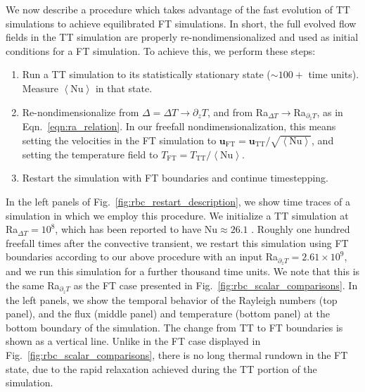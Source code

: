\documentclass[aps, pre, onecolumn, nofootinbib, notitlepage, groupedaddress, amsfonts, amssymb, amsmath, longbibliography, superscriptaddress]{revtex4-1}
\newcommand{\angles}[1]{\ensuremath{\left\langle #1 \right\rangle}}
\begin{document}
We now describe a procedure which takes advantage of the fast evolution of TT simulations to achieve equilibrated FT simulations.
In short, the full evolved flow fields in the TT simulation are properly re-nondimensionalized and used as initial conditions for a FT simulation.
To achieve this, we perform these steps:
\begin{enumerate}
\item Run a TT simulation to its statistically stationary state ($\sim100+$ time units). 
Measure $\angles{\text{Nu}}$ in that state.
\item Re-nondimensionalize from $\Delta = \Delta T \rightarrow \partial_z T$, and from Ra$_{\Delta T}\rightarrow$Ra$_{\partial_z T}$, as in Eqn.~\ref{eqn:ra_relation}.
In our freefall nondimensionalization, this means setting the velocities in the FT simulation to $\bm{u}_{\text{FT}} = \bm{u}_{\text{TT}} / \sqrt{\angles{\text{Nu}}}$, and setting the temperature field to $T_{\text{FT}} = T_{\text{TT}} / \angles{\text{Nu}}$.
\item Restart the simulation with FT boundaries and continue timestepping.
\end{enumerate}
In the left panels of Fig.~\ref{fig:rbc_restart_description}, we show time traces of a simulation in which we employ this procedure.
We initialize a TT simulation at Ra$_{\Delta T} = 10^8$, which has been reported to have $\text{Nu} \approx 26.1$ \cite{zhu&all2018}.
Roughly one hundred freefall times after the convective transient, we restart this simulation using FT boundaries according to our above procedure with an input Ra$_{\partial_z T} = 2.61 \times 10^9$, and we run this simulation for a further thousand time units.
We note that this is the same Ra$_{\partial_z T}$ as the FT case presented in Fig.~\ref{fig:rbc_scalar_comparisons}.
In the left panels, we show the temporal behavior of the Rayleigh numbers (top panel), and the flux (middle panel) and temperature (bottom panel) at the bottom boundary of the simulation.
The change from TT to FT boundaries is shown as a vertical line.
Unlike in the FT case displayed in Fig.~\ref{fig:rbc_scalar_comparisons}, there is no long thermal rundown in the FT state, due to the rapid relaxation achieved during the TT portion of the simulation.
\end{document}
